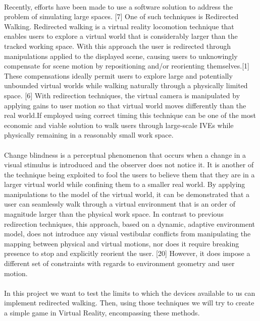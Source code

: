 \documentclass[12pt]{article}
\begin{document}
\\
Recently, efforts have been made to use a software solution to address the problem of simulating large spaces. [7] One of such techniques is Redirected Walking. Redirected walking is a virtual reality locomotion technique that enables users to explore a virtual world that is considerably larger than the tracked working space. With this approach the user is redirected through manipulations applied to the displayed scene, causing users to unknowingly compensate for scene motion by repositioning and/or reorienting themselves.[1] These compensations ideally permit users to explore large and potentially unbounded virtual worlds while walking naturally through a physically limited space. [6] With redirection techniques, the virtual camera is manipulated by applying gains to user motion so that virtual world moves differently than the real world.If employed using correct timing this technique can be one of the most economic and viable solution to walk users through large-scale IVEs while physically remaining in a reasonably small work space.\\
\\
Change blindness is a perceptual phenomenon that occurs when a change in a visual stimulus is introduced and the observer does not notice it. It is another of the technique being exploited to fool the users to believe them that they are in a larger virtual world while confining them to a smaller real world. By applying manipulations to the model of the virtual world, it can be demonstrated that a user can seamlessly walk through a virtual environment that is an order of magnitude larger than the physical work space. In contrast to previous redirection techniques, this approach, based on a dynamic, adaptive environment model, does not introduce any visual vestibular conflicts from manipulating the mapping between physical and virtual motions, nor does it require breaking presence to stop and explicitly reorient the user. [20] However, it does impose a different set of constraints with regards to environment geometry and user motion.\\
\\
In this project we want to test the limits to which the devices available to us can implement redirected walking. Then, using those techniques we will try to create a simple game in Virtual Reality, encompassing these methods.




\clearpage
\end{document}

